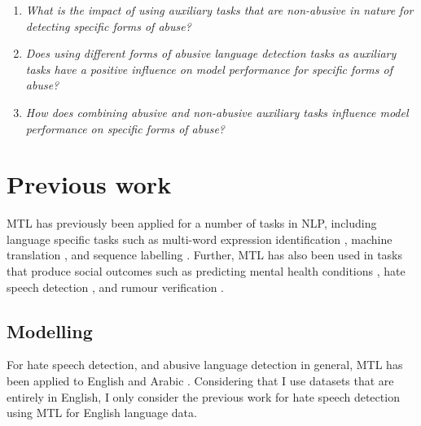 \begin{minipage}{0.9\textwidth}
\vspace{5mm}
    \begin{enumerate}[start=1, label={\textbf{RQ \arabic*}}]
        \item{\textit{What is the impact of using auxiliary tasks that are non-abusive in nature for detecting specific forms of abuse?}}
        \item{\textit{Does using different forms of abusive language detection tasks as auxiliary tasks have a positive influence on model performance for specific forms of abuse?}}
        \item{\textit{How does combining abusive and non-abusive auxiliary tasks influence model performance on specific forms of abuse?}}
    \end{enumerate}
\end{minipage}

\section{Previous work}

MTL has previously been applied for a number of tasks in NLP, including language specific tasks such as multi-word expression identification \cite{Bingel-Bjerva:2018}, machine translation \cite{Dong:2015}, and sequence labelling \cite{Rei:2017}.
Further, MTL has also been used in tasks that produce social outcomes such as predicting mental health conditions \cite{Benton:2017}, hate speech detection \cite{Waseem:2018,Rajamanickam:2020,Farha:2020,Djandji:2019}, and rumour verification \cite{Kochkina:2018}.

\subsection{Modelling}
For hate speech detection, and abusive language detection in general, MTL has been applied to English \citep{Waseem:2018,Rajamanickam:2020} and Arabic \citep{Farha:2020,Djandji:2019}.
Considering that I use datasets that are entirely in English, I only consider the previous work for hate speech detection using MTL for English language data.

